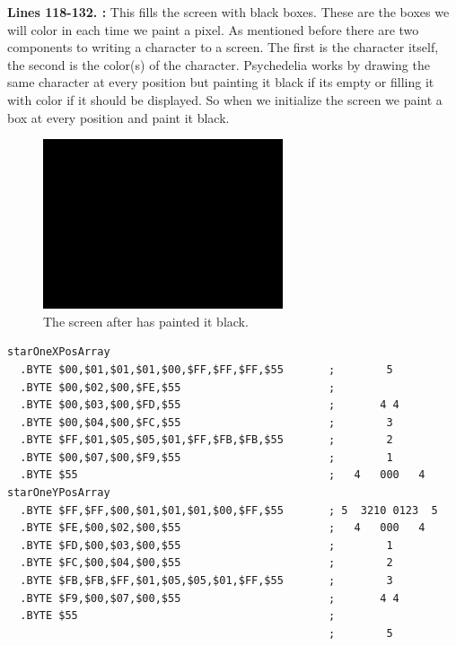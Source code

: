 \bigskip
\bigskip
\bigskip
\bigskip
\textbf{Lines 118-132. :} This fills the screen with black boxes. These are the boxes we will color in each time we paint a pixel.
As mentioned before there are two components to writing a character to a screen. The first is the character
itself, the second is the color(s) of the character. Psychedelia works by drawing the same character at every
position but painting it black if its empty or filling it with color if it should be displayed. So when
we initialize the screen we paint a box at every position and paint it black.

\begin{figure}[H]
    \centering
      \includegraphics[height=5cm]{src/listing_commentary/black.png}
  \caption*{The screen after  has painted it black.}
\end{figure}

\clearpage
\begin{lstlisting}[caption = Hopefully this looks familiar.]
starOneXPosArray
  .BYTE $00,$01,$01,$01,$00,$FF,$FF,$FF,$55       ;        5       
  .BYTE $00,$02,$00,$FE,$55                       ;                
  .BYTE $00,$03,$00,$FD,$55                       ;       4 4      
  .BYTE $00,$04,$00,$FC,$55                       ;        3       
  .BYTE $FF,$01,$05,$05,$01,$FF,$FB,$FB,$55       ;        2       
  .BYTE $00,$07,$00,$F9,$55                       ;        1       
  .BYTE $55                                       ;   4   000   4  
starOneYPosArray
  .BYTE $FF,$FF,$00,$01,$01,$01,$00,$FF,$55       ; 5  3210 0123  5
  .BYTE $FE,$00,$02,$00,$55                       ;   4   000   4  
  .BYTE $FD,$00,$03,$00,$55                       ;        1       
  .BYTE $FC,$00,$04,$00,$55                       ;        2       
  .BYTE $FB,$FB,$FF,$01,$05,$05,$01,$FF,$55       ;        3       
  .BYTE $F9,$00,$07,$00,$55                       ;       4 4      
  .BYTE $55                                       ;                
                                                  ;        5       
\end{lstlisting}


